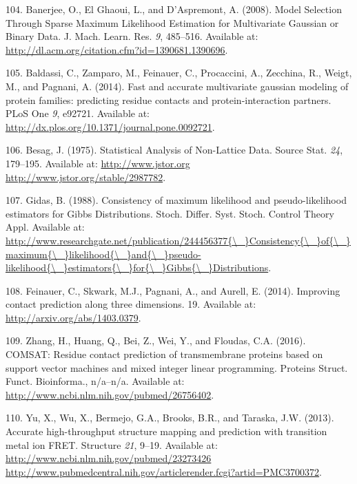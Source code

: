 \documentclass[11pt,a4paper,twoside]{book}
\theoremstyle{definition}
\theoremstyle{definition}
\theoremstyle{remark}
\begin{document}
\hypertarget{ref-Banerjee2008}{}
104. Banerjee, O., El Ghaoui, L., and D'Aspremont, A. (2008). Model
Selection Through Sparse Maximum Likelihood Estimation for Multivariate
Gaussian or Binary Data. J. Mach. Learn. Res. \emph{9}, 485--516.
Available at: \url{http://dl.acm.org/citation.cfm?id=1390681.1390696}.

\hypertarget{ref-Baldassi2014}{}
105. Baldassi, C., Zamparo, M., Feinauer, C., Procaccini, A., Zecchina,
R., Weigt, M., and Pagnani, A. (2014). Fast and accurate multivariate
gaussian modeling of protein families: predicting residue contacts and
protein-interaction partners. PLoS One \emph{9}, e92721. Available at:
\url{http://dx.plos.org/10.1371/journal.pone.0092721}.

\hypertarget{ref-Besag1975}{}
106. Besag, J. (1975). Statistical Analysis of Non-Lattice Data. Source
Stat. \emph{24}, 179--195. Available at:
\href{http://www.jstor.org\%20http://www.jstor.org/stable/2987782}{http://www.jstor.org http://www.jstor.org/stable/2987782}.

\hypertarget{ref-Gidas1988}{}
107. Gidas, B. (1988). Consistency of maximum likelihood and
pseudo-likelihood estimators for Gibbs Distributions. Stoch. Differ.
Syst. Stoch. Control Theory Appl. Available at:
\href{http://www.researchgate.net/publication/244456377\%7B/_\%7DConsistency\%7B/_\%7Dof\%7B/_\%7Dmaximum\%7B/_\%7Dlikelihood\%7B/_\%7Dand\%7B/_\%7Dpseudo-likelihood\%7B/_\%7Destimators\%7B/_\%7Dfor\%7B/_\%7DGibbs\%7B/_\%7DDistributions}{http://www.researchgate.net/publication/244456377\{\textbackslash{}\_\}Consistency\{\textbackslash{}\_\}of\{\textbackslash{}\_\}maximum\{\textbackslash{}\_\}likelihood\{\textbackslash{}\_\}and\{\textbackslash{}\_\}pseudo-likelihood\{\textbackslash{}\_\}estimators\{\textbackslash{}\_\}for\{\textbackslash{}\_\}Gibbs\{\textbackslash{}\_\}Distributions}.

\hypertarget{ref-Feinauer2014}{}
108. Feinauer, C., Skwark, M.J., Pagnani, A., and Aurell, E. (2014).
Improving contact prediction along three dimensions. 19. Available at:
\url{http://arxiv.org/abs/1403.0379}.

\hypertarget{ref-Zhang2016}{}
109. Zhang, H., Huang, Q., Bei, Z., Wei, Y., and Floudas, C.A. (2016).
COMSAT: Residue contact prediction of transmembrane proteins based on
support vector machines and mixed integer linear programming. Proteins
Struct. Funct. Bioinforma., n/a--n/a. Available at:
\url{http://www.ncbi.nlm.nih.gov/pubmed/26756402}.

\hypertarget{ref-Yu2013}{}
110. Yu, X., Wu, X., Bermejo, G.A., Brooks, B.R., and Taraska, J.W.
(2013). Accurate high-throughput structure mapping and prediction with
transition metal ion FRET. Structure \emph{21}, 9--19. Available at:
\href{http://www.ncbi.nlm.nih.gov/pubmed/23273426\%20http://www.pubmedcentral.nih.gov/articlerender.fcgi?artid=PMC3700372}{http://www.ncbi.nlm.nih.gov/pubmed/23273426 http://www.pubmedcentral.nih.gov/articlerender.fcgi?artid=PMC3700372}.
\end{document}
